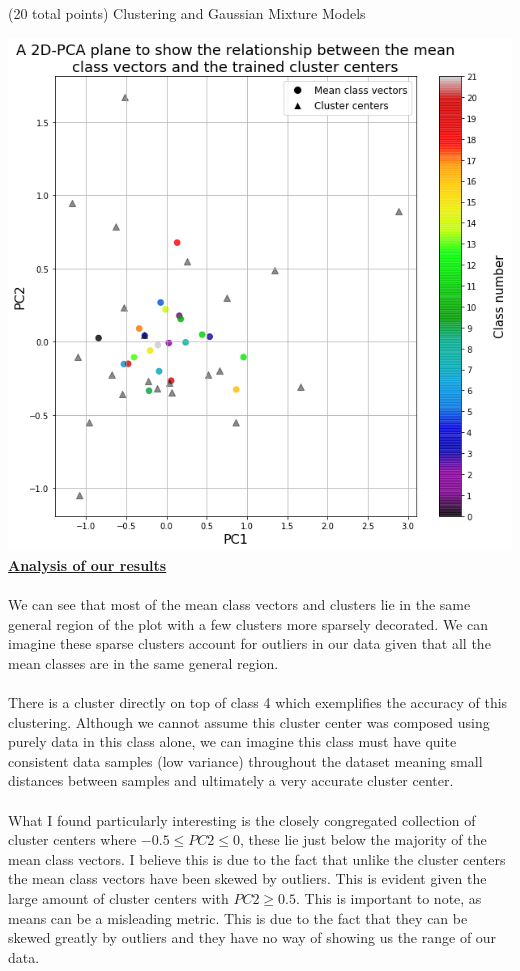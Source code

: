 \documentclass[12pt]{article}
\begin{document}
\begin{question}{(20 total points) Clustering and Gaussian Mixture Models}
\begin{subquestion}
   

      \begin{answerbox}{51.4em}
         \includegraphics[width=1\textwidth]{images/q32.png}
        \footnotesize{\textbf{\underline{Analysis of our results}}}\\
\\
        \scriptsize{
        We can see that most of the mean class vectors and clusters lie in the same general region of the plot with a few clusters more sparsely decorated. We can imagine these sparse clusters account for outliers in our data given that all the mean classes are in the same general region. \\
\\
        There is a cluster directly on top of class 4 which exemplifies the accuracy of this clustering. Although we cannot assume this cluster center was composed using purely data in this class alone,  we can imagine this class must have quite consistent data samples (low variance) throughout the dataset meaning small distances between samples and ultimately a very accurate cluster center.\\
\\
        What I found particularly interesting is the closely congregated collection of cluster centers where $-0.5 \leq PC2 \leq 0$, these lie just below the majority of the mean class vectors. I believe this is due to the fact that unlike the cluster centers the mean class vectors have been skewed by outliers. This is evident given the large amount of cluster centers with $PC2 \geq 0.5$. This is important to note, as means can be a misleading metric. This is due to the fact that they can be skewed greatly by outliers and they have no way of showing us the range of our data.
        }
      \end{answerbox}
  



\end{subquestion}
\end{question}
\end{document}
